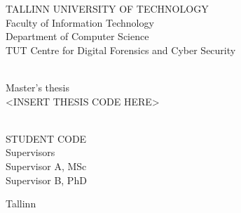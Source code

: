 \begin{titlepage}
\begingroup
	\singlespace
	\begin{center}
			TALLINN UNIVERSITY OF TECHNOLOGY \\
			Faculty of Information Technology \\
			Department of Computer Science \\
            TUT Centre for Digital Forensics and Cyber Security

		\vfill
			\huge \textbf{\MyTitle}\\[1cm]
			\large Master's thesis\\[1cm]
            <INSERT THESIS CODE HERE>\\[4cm]
            \normalsize

			\begin{flushright}
				\MyAuthor \\
				STUDENT CODE\\[1.5cm]
				Supervisors \\
                Supervisor A, MSc\\
				Supervisor B, PhD\\
			\end{flushright}
		\vfill

		Tallinn \MyDate
	\end{center}
\endgroup
\end{titlepage}
